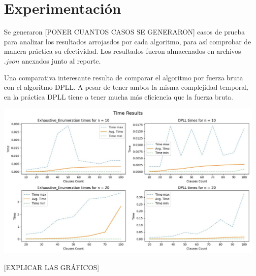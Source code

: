 \documentclass{article}
\begin{document}
\section*{Experimentación}
    Se generaron [PONER CUANTOS CASOS SE GENERARON] casos de prueba para analizar los resultados arrojasdos por cada 
    algoritmo, para así comprobar de manera práctica su efectividad. Los resultados fueron almacenados en archivos 
    $.json$ anexados junto al reporte.
    
    Una comparativa interesante resulta de comparar el algoritmo por fuerza bruta con el algoritmo DPLL. A 
    pesar de tener ambos la misma complejidad temporal, en la práctica DPLL tiene a tener mucha más eficiencia 
    que la fuerza bruta. 

    \includegraphics*{resources/comp_algs.png}
    
    [EXPLICAR LAS GRÁFICOS]




\end{document}
